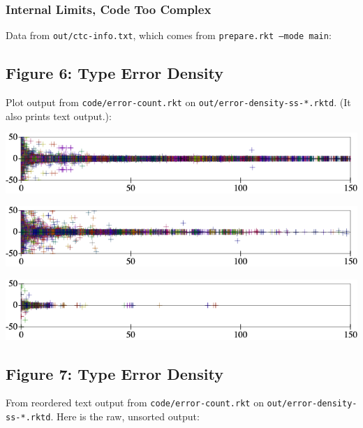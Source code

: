 \documentclass{article}
\begin{document}
\subsubsection*{Internal Limits, Code Too Complex}

Data from \texttt{out/ctc-info.txt}, which comes from
\texttt{prepare.rkt --mode main}:

{\footnotesize

}


\subsection*{Figure 6: Type Error Density}

Plot output from \texttt{code/error-count.rkt}
on \texttt{out/error-density-ss-*.rktd}.
(It also prints text output.):

\includegraphics[width=0.8\columnwidth]{out/error-count-nocheck-row--te-density-diff.png}

\includegraphics[width=0.8\columnwidth]{out/error-count-nonstrict-row--te-density-diff.png}

\includegraphics[width=0.8\columnwidth]{out/error-count-strict-row--te-density-diff.png}


\subsection*{Figure 7: Type Error Density}

From reordered text output from \texttt{code/error-count.rkt}
on \texttt{out/error-density-ss-*.rktd}.
Here is the raw, unsorted output:
\end{document}
